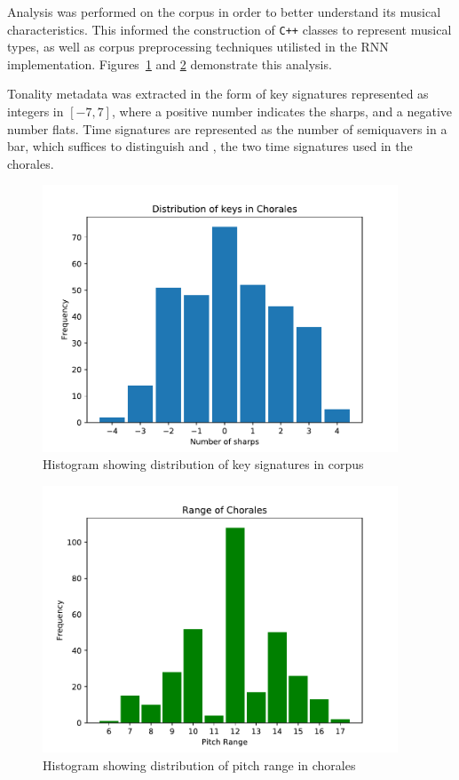 \documentclass[12pt,a4paper,twoside,openright]{report}
\begin{document}
Analysis was performed on the corpus in order to better understand its musical
characteristics. This informed the construction of \texttt{C++} classes to
represent musical types, as well as corpus preprocessing techniques utilisted in
the RNN implementation. Figures~\ref{fig:key-dist} and \ref{fig:range-dist}
demonstrate this analysis.

Tonality metadata was extracted in the form of key signatures represented as
integers in $[-7,7]$, where a positive number indicates the sharps, and a
negative number flats. Time signatures are represented as the number of
semiquavers in a bar, which suffices to distinguish  and
, the two time signatures used in the chorales.

\begin{figure}[H]
\centering
\includegraphics[width=300pt]{figs/key_dist.pdf}
\caption{Histogram showing distribution of key signatures in corpus}
\label{fig:key-dist}
\end{figure}

\begin{figure}[H]
\centering
\includegraphics[width=300pt]{figs/range_dist.pdf}
\caption{Histogram showing distribution of pitch range in chorales}
\label{fig:range-dist}
\end{figure}
\end{document}
